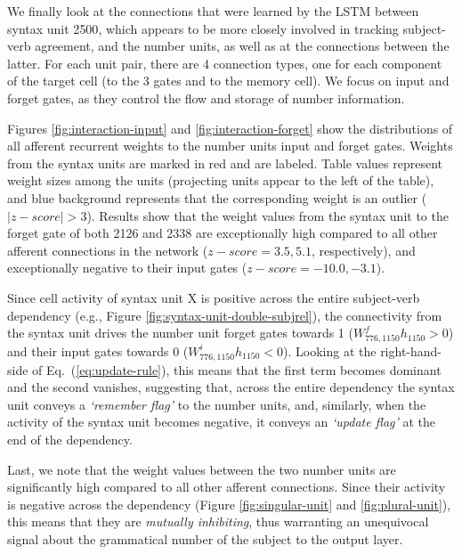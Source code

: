 We finally look at the connections that were learned by the LSTM
between syntax unit \unit{2}{500}, which appears to be more closely involved in
tracking subject-verb agreement, and the number units, as well as at
the connections between the latter. For each unit pair, there are 4
connection types, one for each component of the target cell (to the 3
gates and to the memory cell). We focus on input and forget gates, as they control the flow and storage of number information.


Figures \ref{fig:interaction-input} and \ref{fig:interaction-forget} show the distributions of all afferent recurrent weights to the number units input and forget gates. Weights from the syntax units are marked in red and are labeled. Table values represent weight sizes among the units (projecting units appear to the left of the table), and blue background represents that the corresponding weight is an outlier ($|z-score|>3$). Results show that the weight values from the syntax unit to the forget gate of both \unit{2}{126} and \unit{2}{338} are exceptionally high compared to all other afferent connections in the network ($z-score=3.5, 5.1$, respectively), and exceptionally negative to their input gates ($z-score=-10.0, -3.1$).  

Since cell activity of syntax unit X is positive across the entire
subject-verb dependency (e.g., Figure
\ref{fig:syntax-unit-double-subjrel}), the connectivity from the
syntax unit drives the number unit forget gates towards 1
($W^f_{776, 1150}h_{1150}>0$) and their input gates towards 0
($W^i_{776, 1150}h_{1150}<0$). Looking at the right-hand-side of
Eq.~(\ref{eq:update-rule}), this means that the first term becomes
  dominant and the second vanishes, suggesting that, across the entire
  dependency the syntax unit conveys a \textit{`remember flag'}
  to the number units, and, similarly, when the activity of the syntax
  unit becomes negative, it conveys an \textit{`update
    flag'} at the end of the dependency.

Last, we note that the weight values between the two number units are significantly high compared to all other afferent connections. Since their activity is negative across the dependency (Figure \ref{fig:singular-unit} and \ref{fig:plural-unit}), this means that they are \textit{mutually inhibiting}, thus warranting an unequivocal signal about the grammatical number of the subject to the output layer.

